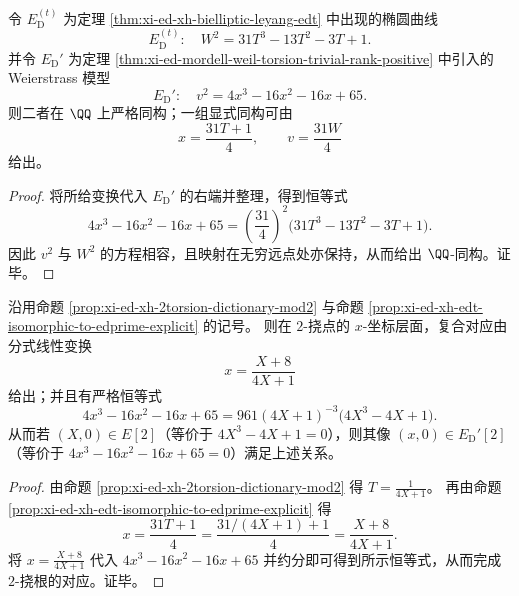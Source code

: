 \begin{proposition}\label{prop:xi-ed-xh-edt-isomorphic-to-edprime-explicit}
令 \(E_{\mathrm D}^{(t)}\) 为定理 \ref{thm:xi-ed-xh-bielliptic-leyang-edt} 中出现的椭圆曲线
\[
E_{\mathrm D}^{(t)}:\quad W^2=31T^3-13T^2-3T+1.
\]
并令 \(E_{\mathrm D}'\) 为定理 \ref{thm:xi-ed-mordell-weil-torsion-trivial-rank-positive} 中引入的 Weierstrass 模型
\[
E_{\mathrm D}':\quad v^{2}=4x^{3}-16x^{2}-16x+65.
\]
则二者在 \(\QQ\) 上严格同构；一组显式同构可由
\[
x=\frac{31T+1}{4},
\qquad
v=\frac{31W}{4}
\]
给出。
\end{proposition}
\begin{proof}
将所给变换代入 \(E_{\mathrm D}'\) 的右端并整理，得到恒等式
\[
4x^{3}-16x^{2}-16x+65
=\left(\frac{31}{4}\right)^{2}\bigl(31T^3-13T^2-3T+1\bigr).
\]
因此 \(v^2\) 与 \(W^2\) 的方程相容，且映射在无穷远点处亦保持，从而给出 \(\QQ\)-同构。证毕。
\end{proof}

\begin{corollary}\label{cor:xi-ed-xh-2torsion-dictionary-edprime}
沿用命题 \ref{prop:xi-ed-xh-2torsion-dictionary-mod2} 与命题 \ref{prop:xi-ed-xh-edt-isomorphic-to-edprime-explicit} 的记号。
则在 \(2\)-挠点的 \(x\)-坐标层面，复合对应由分式线性变换
\[
x=\frac{X+8}{4X+1}
\]
给出；并且有严格恒等式
\[
4x^3-16x^2-16x+65
=961(4X+1)^{-3}\bigl(4X^3-4X+1\bigr).
\]
从而若 \((X,0)\in E[2]\)（等价于 \(4X^3-4X+1=0\)），则其像 \((x,0)\in E_{\mathrm D}'[2]\)（等价于 \(4x^3-16x^2-16x+65=0\)）满足上述关系。
\end{corollary}
\begin{proof}
由命题 \ref{prop:xi-ed-xh-2torsion-dictionary-mod2} 得 \(T=\frac{1}{4X+1}\)。
再由命题 \ref{prop:xi-ed-xh-edt-isomorphic-to-edprime-explicit} 得
\[
x=\frac{31T+1}{4}=\frac{31/(4X+1)+1}{4}=\frac{X+8}{4X+1}.
\]
将 \(x=\frac{X+8}{4X+1}\) 代入 \(4x^3-16x^2-16x+65\) 并约分即可得到所示恒等式，从而完成 \(2\)-挠根的对应。证毕。
\end{proof}

